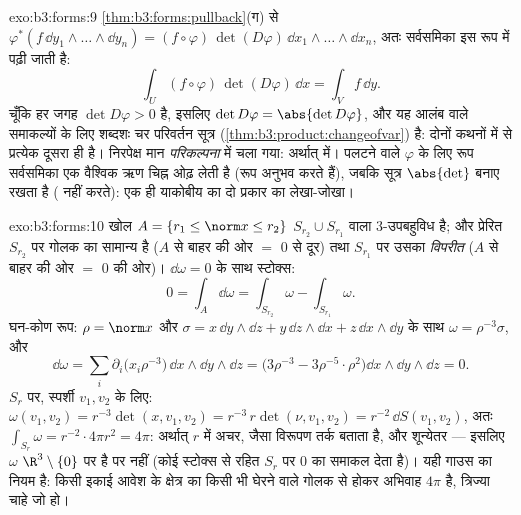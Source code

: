 \begin{solution}{exo:b3:forms:9}
\cref{thm:b3:forms:pullback}(ग) से
$\varphi^*(f\,\dd y_1\wedge\dots\wedge\dd y_n) =
(f\circ\varphi)\,\det(D\varphi)\,\dd
x_1\wedge\dots\wedge\dd x_n$, अतः  सर्वसमिका इस
रूप में पढ़ी जाती है:
\[
\int_U(f\circ\varphi)\,\det(D\varphi)\,\dd x = \int_Vf\,\dd
y .
\]
चूँकि हर जगह $\det D\varphi > 0$ है, इसलिए $\det D\varphi =
\abs{\det D\varphi}$, और यह  आलंब वाले  समाकल्यों के
लिए शब्दशः चर परिवर्तन सूत्र
(\cref{thm:b3:product:changeofvar}) है: दोनों कथनों में से
प्रत्येक दूसरा ही है। निरपेक्ष मान \emph{परिकल्पना} में चला
गया: अर्थात्  में।  पलटने वाले $\varphi$
के लिए रूप सर्वसमिका एक वैश्विक ऋण चिह्न ओढ़ लेती है (रूप
 अनुभव करते हैं), जबकि  सूत्र $\abs{\det}$ बनाए
रखता है ( नहीं करते): एक ही याकोबीय का दो प्रकार का
लेखा-जोखा।
\end{solution}

\begin{solution}{exo:b3:forms:10}
खोल $A = \{r_1 \leq \norm x \leq r_2\}$ 
$S_{r_2}\cup S_{r_1}$ वाला  $3$-उपबहुविध है; और प्रेरित
 $S_{r_2}$ पर गोलक का सामान्य  है ($A$ से
बाहर की ओर $=$ $0$ से दूर) तथा $S_{r_1}$ पर उसका
\emph{विपरीत} ($A$ से बाहर की ओर $=$ $0$ की ओर)। $\dd\omega
= 0$ के साथ स्टोक्स:
\[
0 = \int_A\dd\omega = \int_{S_{r_2}}\omega -
\int_{S_{r_1}}\omega .
\]
घन-कोण रूप: $\rho = \norm x$ और $\sigma =
x\,\dd y\wedge\dd z + y\,\dd z\wedge\dd x + z\,\dd
x\wedge\dd y$ के साथ $\omega = \rho^{-3}\sigma$, और
\[
\dd\omega = \sum_i\partial_i\bigl(x_i\rho^{-3}\bigr)\,
\dd x\wedge\dd y\wedge\dd z
= \bigl(3\rho^{-3} - 3\rho^{-5}\cdot\rho^2\bigr)\dd
x\wedge\dd y\wedge\dd z = 0 .
\]
$S_r$ पर, स्पर्शी $v_1, v_2$ के लिए: $\omega(v_1, v_2) =
r^{-3}\det(x, v_1, v_2) = r^{-3}\,r\det(\nu, v_1, v_2) =
r^{-2}\,\dd S(v_1, v_2)$, अतः $\int_{S_r}\omega =
r^{-2}\cdot4\pi r^2 = 4\pi$: अर्थात् $r$ में अचर, जैसा
विरूपण तर्क बताता है, और शून्येतर --- इसलिए $\omega$
$\R^3\setminus\{0\}$ पर  है पर  नहीं (कोई  स्टोक्स से  रहित $S_r$ पर $0$ का समाकल देता है)।
यही गाउस का नियम है: किसी इकाई आवेश के क्षेत्र का किसी भी
घेरने वाले गोलक से होकर अभिवाह $4\pi$ है, त्रिज्या चाहे जो
हो।
\end{solution}

